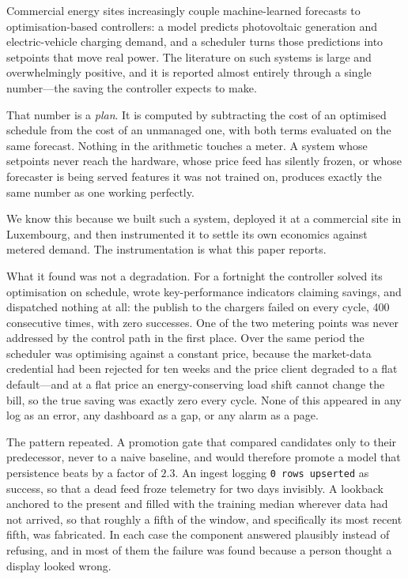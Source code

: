 Commercial energy sites increasingly couple machine-learned forecasts to
optimisation-based controllers: a model predicts photovoltaic generation and
electric-vehicle charging demand, and a scheduler turns those predictions into
setpoints that move real power. The literature on such systems is large and
overwhelmingly positive, and it is reported almost entirely through a single
number---the saving the controller expects to make.

That number is a \emph{plan}. It is computed by subtracting the cost of an
optimised schedule from the cost of an unmanaged one, with both terms evaluated
on the same forecast. Nothing in the arithmetic touches a meter. A system whose
setpoints never reach the hardware, whose price feed has silently frozen, or
whose forecaster is being served features it was not trained on, produces
exactly the same number as one working perfectly.

We know this because we built such a system, deployed it at a commercial site
in Luxembourg, and then instrumented it to settle its own economics against
metered demand. The instrumentation is what this paper reports.

What it found was not a degradation. For a fortnight the controller solved its
optimisation on schedule, wrote key-performance indicators claiming savings,
and dispatched nothing at all: the publish to the chargers failed on every
cycle, 400 consecutive times, with zero successes. One of the two metering
points was never addressed by the control path in the first place. Over the
same period the scheduler was optimising against a constant price, because the
market-data credential had been rejected for ten weeks and the price client
degraded to a flat default---and at a flat price an energy-conserving load
shift cannot change the bill, so the true saving was exactly zero every cycle.
None of this appeared in any log as an error, any dashboard as a gap, or any
alarm as a page.

The pattern repeated. A promotion gate that compared candidates only to their
predecessor, never to a naive baseline, and would therefore promote a model
that persistence beats by a factor of $2.3$. An ingest logging \texttt{0 rows
upserted} as success, so that a dead feed froze telemetry for two days
invisibly. A lookback anchored to the present and filled with the training
median wherever data had not arrived, so that roughly a fifth of the window,
and specifically its most recent fifth, was fabricated. In each case the
component answered plausibly instead of refusing, and in most of them the
failure was found because a person thought a display looked wrong.

